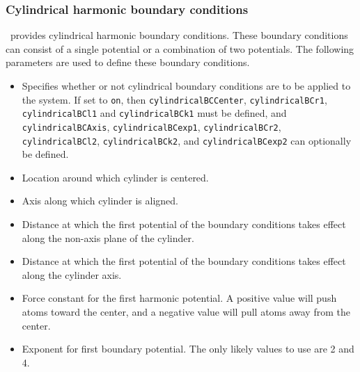 \subsubsection{Cylindrical harmonic boundary conditions}

\NAMD\ provides cylindrical harmonic boundary conditions.  These 
boundary conditions can consist of a single potential or a 
combination of two potentials.
The following parameters are used to define these boundary conditions.  

\begin{itemize}

\item
{}
{Specifies whether or not cylindrical boundary conditions 
are to be applied to the system.  If 
set to {\tt on}, then {\tt cylindricalBCCenter}, {\tt cylindricalBCr1}, {\tt cylindricalBCl1} and {\tt cylindricalBCk1} 
must be defined, and {\tt cylindricalBCAxis}, {\tt cylindricalBCexp1}, {\tt cylindricalBCr2}, {\tt cylindricalBCl2},
{\tt cylindricalBCk2}, and {\tt cylindricalBCexp2} can optionally be 
defined.}

\item
{}
{Location around which cylinder is centered.}

\item
{}
{Axis along which cylinder is aligned.}

\item
{}
{Distance at which the first potential of the boundary conditions takes
effect along the non-axis plane of the cylinder.}

\item
{}
{Distance at which the first potential of the boundary conditions takes
effect along the cylinder axis.}

\item
{}
{Force constant for the first harmonic potential.  A positive
value will push atoms toward the center, and a negative
value will pull atoms away from the center.}

\item
{}
{Exponent for first boundary potential.  The only likely values to
use are 2 and 4.}


\end{itemize}
